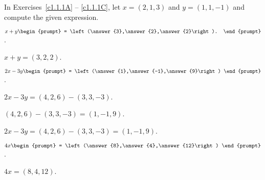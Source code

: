 \documentclass{ximera}
\begin{document}
\noindent In Exercises~\ref{c1.1.1A} -- \ref{c1.1.1C}, let $x=(2,1,3)$ and 
$y=(1,1,-1)$ and compute the given expression.
\begin{exercise}  \label{c1.1.1A}
  $x+y\begin{prompt}
    = \left(\answer{3},\answer{2},\answer{2}\right).
  \end{prompt}$.

\begin{solution}
\ans $ x + y = (3,2,2)$.

\end{solution}
\end{exercise}

\begin{exercise}  \label{c1.1.1B}
  $2x-3y\begin{prompt}
    = \left(\answer{1},\answer{-1},\answer{9}\right)
  \end{prompt}$.
  \begin{hint}
    $2x - 3y = (4,2,6) - (3,3,-3)$.
  \end{hint}
  \begin{hint}
    $(4,2,6) - (3,3,-3) = (1,-1,9)$.
  \end{hint}  

\begin{solution}
\ans $2x - 3y = (4,2,6) - (3,3,-3) = (1,-1,9)$.

\end{solution}
\end{exercise}

\begin{exercise}  \label{c1.1.1C}
  $4x\begin{prompt}
    = \left(\answer{8},\answer{4},\answer{12}\right)
    \end{prompt}$.

\begin{solution}
\ans $4x = (8,4,12)$.
\end{solution}
\end{exercise}
\end{document}
